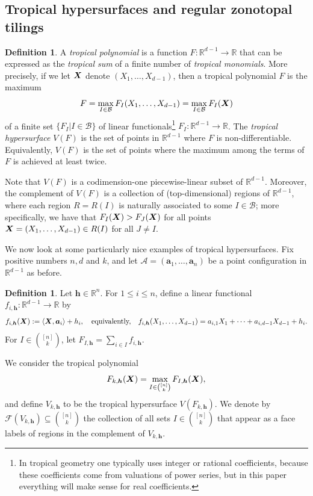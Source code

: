 \documentclass[11pt]{amsart}
\theoremstyle{plain}
\theoremstyle{definition}
\newtheorem{definition}[theorem]{Definition}
\def\R{\mathbb{R}}
\def\A{\mathcal{A}}
\def\h{{\bm{h}}}
\def\a{{\bm{a}}}
\let\subset\subseteq
\begin{document}
\subsection{Tropical hypersurfaces and regular zonotopal tilings}
\begin{definition}
	A \emph{tropical polynomial} is a function $F: \R^{d-1} \to \R$ that can be expressed
as the \emph{tropical sum} of a finite number of \emph{tropical monomials}. 
More precisely, if we let $\bm{X}$ denote $(X_1,\dots,X_{d-1})$, then a tropical
polynomial $F$ is the maximum
	$$F = \max_{I\in\mathcal{B}} F_I(X_1,\dots, X_{d-1}) = 
	    \max_{I\in \mathcal{B}} F_I(\bm{X})$$ of a
        finite set $\{F_I| I \in \mathcal{B}\}$
        of linear functionals\footnote{In tropical geometry one typically
  uses integer or rational coefficients, because these coefficients come
        from valuations of power series, but in this paper everything
will make sense for real coefficients.}
	$F_I: \R^{d-1} \to\R$.
The \emph{tropical hypersurface} $V(F)$ is the set of points in
	$\R^{d-1}$ where $F$ is non-differentiable.  Equivalently, $V(F)$ is
the set of points where the maximum among the terms of $F$ is achieved
at least twice.
\end{definition}
Note that $V(F)$ is a codimension-one piecewise-linear subset of $\R^{d-1}$.  Moreover,
the complement of $V(F)$ is a collection of (top-dimensional) regions
of $\R^{d-1}$, where each region $R=R(I)$ is naturally associated to
some $I \in \mathcal{B}$; more specifically, we have that
$F_{I}(\bm{X}) > F_J(\bm{X})$ for all points
$\bm{X} = (X_1,\dots,X_{d-1})\in R(I)$ for all $J \neq I$.

\def\FL{\mathcal{F}}
\def\FLKH{\FL(V_{k,\h})}
\def\Vkh{V_{k,\h}}

\def\Xtq{{\widetilde\X}_q}

We now look at some particularly nice examples of tropical hypersurfaces. Fix positive numbers $n, d$ and $k$, and let $\A=(\a_1,\dots,\a_n)$ be a point configuration in $\R^{d-1}$ as before.

\begin{definition}\label{def:soliton} 
Let $\h\in\R^n$. For $1\leq i \leq n$, define a linear functional
	$f_{i,\h}: \R^{d-1} \to \R$ by 
	\begin{equation}\label{functional}
          f_{i,\h}(\X):=\<\X,\a_i\>+h_i,\quad\text{equivalently,}\quad	f_{i,\h}(X_1,\dots, X_{d-1}) = a_{i,1} X_1 + \dots + a_{i,{d-1}} X_{d-1} + h_i.
	\end{equation}
 For $I \in {[n] \choose k}$, let $F_{I,\h} = \sum_{i\in I} f_{i,\h}.$

We consider the tropical polynomial
	\begin{equation}\label{eq:troppoly}
		F_{k,\h}(\X)=	
		\max_{I \in {[n] \choose k}} F_{I,\h}(\X),
	\end{equation}
and define  $\Vkh$  to be
the tropical hypersurface $V(F_{k,\h})$.  
We denote by $\FLKH\subset {[n]\choose k}$ the collection of all sets $I \in {[n] \choose k}$ that appear as a face labels of regions in the complement of $\Vkh$.
\end{definition}
\end{document}
